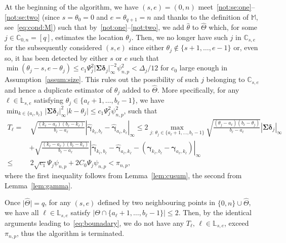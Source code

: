 \documentclass[11pt, a4paper]{article}
\renewcommand{\l}{\left}
\renewcommand{\r}{\right}
\def\wh{\widehat}
\newcommand{\cp}{\theta}
\newcommand{\Cp}{\Theta}
\newcommand{\nn}{\nonumber}
\theoremstyle{definition}
\theoremstyle{definition}
\theoremstyle{definition}
\theoremstyle{definition}
\theoremstyle{definition}
\theoremstyle{remark}
\theoremstyle{definition}
\theoremstyle{definition}
\theoremstyle{definition}
\begin{document}
At the beginning of the algorithm, we have $(s, e) = (0, n)$ meet~\ref{not:se:one}--\ref{not:se:two} (since $s = \cp_0 = 0$ and $e = \cp_{q + 1} = n$ {and thanks to the definition of $\mathbb{M}$, see~\eqref{eq:cond:M}}) such that by~\ref{not:one}--\ref{not:two}, we add $\wh\cp$ to $\wh{\Cp}$ which, for some $j \in \mathbb{C}_{0, n} = [q]$, estimates the location $\cp_j$.
Then, we no longer have such $j$ in $\mathbb{C}_{s, e}$ for the subsequently considered $(s, e)$ since either $\cp_j \notin \{s + 1, \ldots, e - 1\}$ or, even so, it has been detected by either $s$ or $e$ such that $\min(\cp_j - s, e - \cp_j) \le c_1 \Psi_j^2 \vert \bm\Sigma \bm\delta_j \vert_\infty^{-2} \psi_{n, p}^2 < \Delta_j/12$ for $c_0$ large enough in Assumption~\ref{assum:size}.
This rules out the possibility of such $j$ belonging to $\mathbb{C}_{s, e}$ and hence a duplicate estimator of $\cp_j$ added to $\wh{\Cp}$.
More specifically, for any $\ell \in \mathbb{L}_{s, e}$ satisfying $\cp_j \in \{ a_\ell + 1, \ldots, b_\ell - 1\}$, we have $\min_{k \in \{a_\ell, b_\ell \}} \vert \bm\Sigma \bm\delta_j \vert_\infty^2 \vert k - \cp_j \vert \le c_1 \Psi_j^2 \psi_{n, p}^2$, such that
\begin{align}
T_\ell =& \, \sqrt{ \frac{(k_\ell - a_\ell) (b_\ell - k_\ell)}{b_\ell - a_\ell} } \l\vert \wh{\bm\gamma}_{k_\ell, b_\ell} - \wh{\bm\gamma}_{a_\ell, k_\ell} \r\vert_\infty \le 2 \max_{j: \, \cp_j \in \{a_\ell + 1, \ldots, b_\ell - 1\}} \sqrt{ \frac{(\cp_j - a_\ell) (b_\ell - \cp_j)}{b_\ell - a_\ell} } \l\vert \bm\Sigma \bm\delta_j \r\vert_\infty 
\nn \\
& + \sqrt{ \frac{(k_\ell - a_\ell) (b_\ell - k_\ell)}{b_\ell - a_\ell} } \l\vert \wh{\bm\gamma}_{k_\ell, b_\ell} - \wh{\bm\gamma}_{a_\ell, k_\ell} - \l( \bm\gamma_{k_\ell, b_\ell} - \bm\gamma_{a_\ell, k_\ell} \r) \r\vert_\infty 
\nn \\
\le & \, 2 \sqrt{c_1} \Psi_j \psi_{n, p} + 2 C_0 \Psi_j \psi_{n, p} < \pi_{n, p},
\label{eq:bounadary}
\end{align}
where the first inequality follows from Lemma~\ref{lem:cusum}, the second from Lemma~\ref{lem:gamma}.

Once $\vert \wh{\Cp} \vert = q$, for any $(s, e)$ defined by two neighbouring points in $\{0, n\} \cup \wh{\Cp}$, we have all $\ell \in \mathbb{L}_{s, e}$ satisfy $\vert \Cp \cap \{ a_\ell + 1, \ldots, b_\ell - 1\} \vert \le 2$.
Then, by the identical arguments leading to~\eqref{eq:bounadary}, we do not have any $T_\ell, \, \ell \in \mathbb{L}_{s, e}$, exceed $\pi_{n, p}$, thus the algorithm is terminated.
\end{document}
